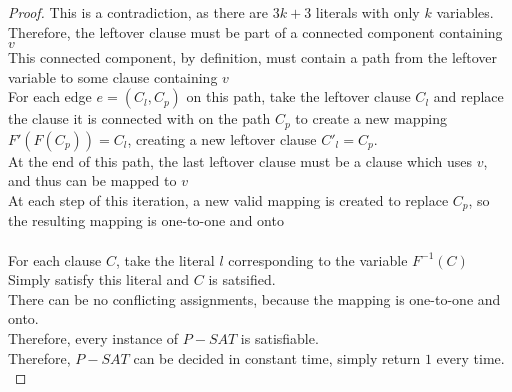 \begin{problem}
\begin{proof}
        This is a contradiction, as there are $3k+3$ literals with only $k$ variables. \\
        Therefore, the leftover clause must be part of a connected component containing $v$ \\
        This connected component, by definition, must contain a path from the leftover variable to some clause containing $v$ \\
        For each edge $e = (C_l, C_p)$ on this path, take the leftover clause $C_l$ and replace the clause it is connected with on the path $C_p$ to create a new
        mapping $F'(F(C_p)) = C_l$, creating a new leftover clause $C'_l = C_p$. \\
        At the end of this path, the last leftover clause must be a clause which uses $v$, and thus can be mapped to $v$ \\
        At each step of this iteration, a new valid mapping is created to replace $C_p$, so the resulting mapping is one-to-one and onto \\\\
        For each clause $C$, take the literal $l$ corresponding to the variable $F^{-1}(C)$ \\
        Simply satisfy this literal and $C$ is satsified. \\
        There can be no conflicting assignments, because the mapping is one-to-one and onto. \\
        Therefore, every instance of $P-SAT$ is satisfiable. \\
        Therefore, $P-SAT$ can be decided in constant time, simply return $1$ every time. \\
    \end{proof}
\end{problem}
